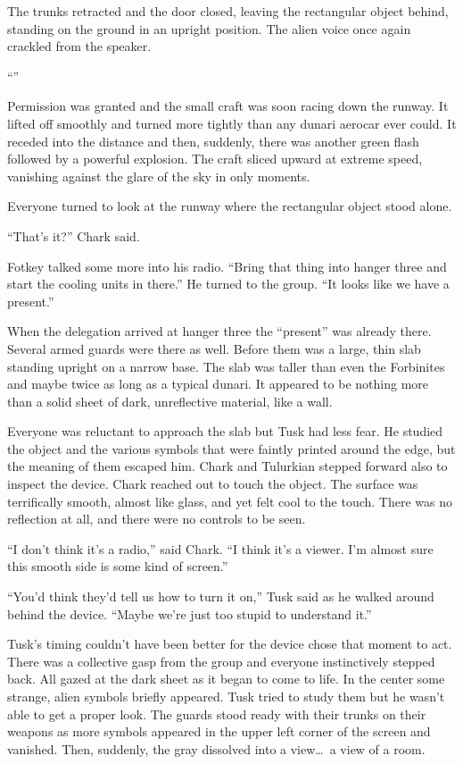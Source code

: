 The trunks retracted and the door closed, leaving the rectangular object behind, standing on the
ground in an upright position. The alien voice once again crackled from the speaker.

``''

Permission was granted and the small craft was soon racing down the runway. It lifted off
smoothly and turned more tightly than any dunari aerocar ever could. It receded into the
distance and then, suddenly, there was another green flash followed by a powerful explosion. The
craft sliced upward at extreme speed, vanishing against the glare of the sky in only moments.

Everyone turned to look at the runway where the rectangular object stood alone.

``That's it?'' Chark said.

Fotkey talked some more into his radio. ``Bring that thing into hanger three and start the
cooling units in there.'' He turned to the group. ``It looks like we have a present.''

When the delegation arrived at hanger three the ``present'' was already there. Several armed
guards were there as well. Before them was a large, thin slab standing upright on a narrow base.
The slab was taller than even the Forbinites and maybe twice as long as a typical dunari. It
appeared to be nothing more than a solid sheet of dark, unreflective material, like a wall.

Everyone was reluctant to approach the slab but Tusk had less fear. He studied the object and
the various symbols that were faintly printed around the edge, but the meaning of them escaped
him. Chark and Tulurkian stepped forward also to inspect the device. Chark reached out to touch
the object. The surface was terrifically smooth, almost like glass, and yet felt cool to the
touch. There was no reflection at all, and there were no controls to be seen.

``I don't think it's a radio,'' said Chark. ``I think it's a viewer. I'm almost sure this smooth
side is some kind of screen.''

``You'd think they'd tell us how to turn it on,'' Tusk said as he walked around behind the
device. ``Maybe we're just too stupid to understand it.''

Tusk's timing couldn't have been better for the device chose that moment to act. There was a
collective gasp from the group and everyone instinctively stepped back. All gazed at the dark
sheet as it began to come to life. In the center some strange, alien symbols briefly appeared.
Tusk tried to study them but he wasn't able to get a proper look. The guards stood ready with
their trunks on their weapons as more symbols appeared in the upper left corner of the screen
and vanished. Then, suddenly, the gray dissolved into a view\ldots\ a view of a room.

